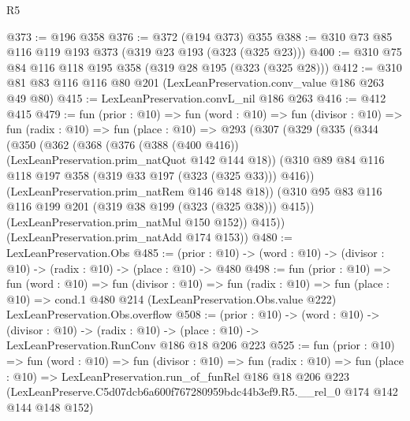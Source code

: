 \begin{lexlean}{R5}
\begin{coremodule}
@373 := @196 @358
@376 := @372 (@194 @373) @355
@388 := @310 @73 @85 @116 @119 @193 @373 (@319 @23 @193 (@323 (@325 @23)))
@400 := @310 @75 @84 @116 @118 @195 @358 (@319 @28 @195 (@323 (@325 @28)))
@412 := @310 @81 @83 @116 @116 @80 @201 (LexLeanPreservation.conv_value @186 @263 @49 @80)
@415 := LexLeanPreservation.convL_nil @186 @263
@416 := @412 @415
@479 := fun (prior : @10) =>
  fun (word : @10) =>
  fun (divisor : @10) =>
  fun (radix : @10) =>
  fun (place : @10) =>
  @293
    (@307
      (@329
        (@335
          (@344
            (@350
              (@362
                (@368
                  (@376 (@388 (@400 @416)) (LexLeanPreservation.prim_natQuot @142 @144 @18))
                  (@310 @89 @84 @116 @118 @197 @358 (@319 @33 @197 (@323 (@325 @33))) @416))
                (LexLeanPreservation.prim_natRem @146 @148 @18))
              (@310 @95 @83 @116 @116 @199 @201 (@319 @38 @199 (@323 (@325 @38))) @415))
            (LexLeanPreservation.prim_natMul @150 @152))
          @415))
      (LexLeanPreservation.prim_natAdd @174 @153))
@480 := LexLeanPreservation.Obs
@485 := (prior : @10) -> (word : @10) -> (divisor : @10) -> (radix : @10) -> (place : @10) -> @480
@498 := fun (prior : @10) =>
  fun (word : @10) =>
  fun (divisor : @10) =>
  fun (radix : @10) =>
  fun (place : @10) =>
  cond.{1} @480 @214 (LexLeanPreservation.Obs.value @222) LexLeanPreservation.Obs.overflow
@508 := (prior : @10) ->
  (word : @10) ->
  (divisor : @10) ->
  (radix : @10) -> (place : @10) -> LexLeanPreservation.RunConv @186 @18 @206 @223
@525 := fun (prior : @10) =>
  fun (word : @10) =>
  fun (divisor : @10) =>
  fun (radix : @10) =>
  fun (place : @10) =>
  LexLeanPreservation.run_of_funRel
    @186
    @18
    @206
    @223
    (LexLeanPreserve.C5d07dcb6a600f767280959bdc44b3ef9.R5.__rel_0 @174 @142 @144 @148 @152)
\end{coremodule}
\end{lexlean}
